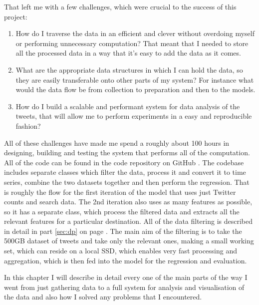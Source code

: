 \documentclass[minf,frontabs,twoside,singlespacing,parskip]{infthesis}
\begin{document}
That left me with a few challenges, which were crucial to the success of this project:
\begin{enumerate}
\item How do I traverse the data in an efficient and clever without overdoing myself or performing unnecessary computation? That meant that I needed to store all the processed data in a way that it's easy to add the data as it comes.
\item What are the appropriate data structures in which I can hold the data, so they are easily transferable onto other parts of my system? For instance what would the data flow be from collection to preparation and then to the models.
\item How do I build a scalable and performant system for data analysis of the tweets, that will allow me to perform experiments in a easy and reproducible fashion?
\end{enumerate}

All of these challenges have made me spend a roughly about 100 hours in designing, building and testing the system that performs all of the computation. All of the code can be found in the code repository on GitHub \cite{code}. The codebase includes separate classes which filter the data, process it and convert it to time series, combine the two datasets together and then perform the regression. That is roughly the flow for the first iteration of the model that uses just Twitter counts and search data. The 2nd iteration also uses as many features as possible, so it has a separate class, which process the filtered data and extracts all the relevant features for a particular destination. All of the data filtering is described in detail in part  \ref{sec:dp} on page \pageref{sec:dp}. The main aim of the filtering is to take the 500GB dataset of tweets and take only the relevant ones, making a small working set, which can reside on a local SSD, which enables very fast processing and aggregation, which is then fed into the model for the regression and evaluation. 

In this chapter I will describe in detail every one of the main parts of the way I went from just gathering data to a full system for analysis and visualisation of the data and also how I solved any problems that I encountered.
\end{document}
